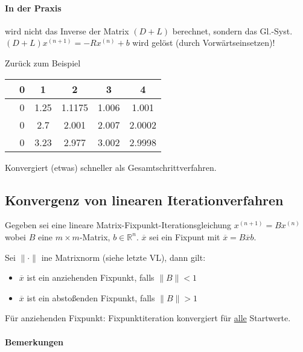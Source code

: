 \documentclass[a4paper,ngerman]{scrbook}
\newcommand{\R}{\ensuremath{\mathds{R}}}%
\begin{document}
\paragraph{In der Praxis}

wird nicht das Inverse der Matrix $(D+L)$ berechnet, sondern das Gl.-Syst\@. $(D+L)x^{(n+1)} = -Rx^{(n)}+ b$ wird gelöst (durch Vorwärtseinsetzen)!

Zurück zum Beispiel

\begin{center}
  \begin{tabular}{c|c|c|c|c|c|}
    & 0 & 1 & 2 & 3 & 4\\\hline
    & 0 & 1.25 & 1.1175 & 1.006 & 1.001\\\hline
    & 0 & 2.7 & 2.001 & 2.007 & 2.0002\\\hline
    & 0 & 3.23 & 2.977 & 3.002 & 2.9998
  \end{tabular}
\end{center}
Konvergiert (etwas) schneller als Gesamtschrittverfahren.

\subsection{Konvergenz von linearen Iterationverfahren}

Gegeben sei eine lineare Matrix-Fixpunkt-Iterationsgleichung $x^{(n+1)} = Bx^{(n)}$ wobei $B$ eine $m \times m$-Matrix, $b \in \R^n$. $\overline{x}$ sei ein Fixpunt mit $\overline{x} = B\overline{x}  b$.

Sei $\|\cdot\|$ ine Matrixnorm (siehe letzte VL), dann gilt: \begin{itemize}
\item[] $\overline{x}$ ist ein anziehenden Fixpunkt, falls $\|B\| < 1$
\item[] $\overline{x}$ ist ein abstoßenden Fixpunkt, falls $\|B\| > 1$
\end{itemize}

Für anziehenden Fixpunkt: Fixpunktiteration konvergiert für \underline{alle} Startwerte.

\paragraph{Bemerkungen}
\end{document}
